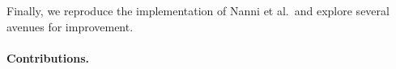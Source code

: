 Finally, we reproduce the implementation of Nanni et al.\ and explore several avenues for improvement.



\paragraph{\textbf{Contributions.}} 


